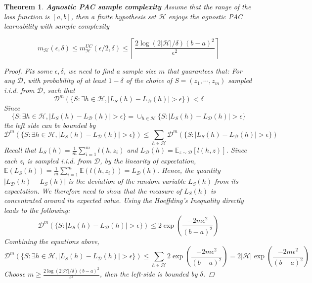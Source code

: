 \documentclass{article}
\newtheorem{theorem}{Theorem}
\newtheorem*{proof}{Proof}
\begin{document}
	\begin{theorem}
	\textbf{Agnostic PAC sample complexity} Assume that the range of the loss function is $[a,b]$, then a finite hypothesis set $\mathcal{H}$ enjoys the agnostic PAC learnability with sample complexity 
	
	\begin{equation}
	m_\mathcal{H}(\epsilon,\delta)\leq m^{UC}_\mathcal{H}(\epsilon/2,\delta)\leq\left\lceil\frac{2\log(2|\mathcal{H}|/\delta)(b-a)^2}{\epsilon^2}\right\rceil
	\end{equation}
	
	\begin{proof}
	Fix some $\epsilon,\delta$, we need to find a sample size $m$ that guarantees that: For any $\mathcal{D}$, with probability of at least $1-\delta$ of the choice of $S=(z_1,\cdots,z_m)$ sampled i.i.d. from $\mathcal{D}$, such that
	\begin{equation*}
	\mathcal{D}^m(\{S:\exists h\in\mathcal{H}, |L_S(h)-L_\mathcal{D}(h)|>\epsilon\}) < \delta
	\end{equation*}
	Since
	\begin{equation*}
	\{S:\exists h\in\mathcal{H}, |L_S(h)-L_\mathcal{D}(h)|>\epsilon\} = \cup_{h\in\mathcal{H}}\{S:|L_S(h)-L_\mathcal{D}(h)|>\epsilon\}
	\end{equation*}
the left side can be bounded by
	\begin{equation*}
	\mathcal{D}^m(\{S:\exists h\in\mathcal{H}, |L_S(h)-L_\mathcal{D}(h)|>\epsilon\}) \leq \sum_{h\in\mathcal{H}} \mathcal{D}^m(\{S:|L_S(h)-L_\mathcal{D}(h)|>\epsilon\})
	\end{equation*}
	Recall that $L_S(h)=\frac{1}{m}\sum_{i=1}^m l(h,z_i)$ and $L_\mathcal{D}(h)=\mathbb{E}_{z\sim\mathcal{D}}[l(h,z)]$. Since each $z_i$ is sampled i.i.d. from $\mathcal{D}$, by the linearity of expectation, $\mathbb{E}(L_S(h))=\frac{1}{m}\sum_{i=1}^m \mathbb{E}(l(h,z_i))=L_\mathcal{D}(h)$. Hence, the quantity $|L_\mathcal{D}(h)-L_S(h)|$ is the deviation of the random variable $L_S(h)$ from its expectation. We therefore need to show that the measure of $L_S(h)$ is concentrated around its expected value. Using the Hoeffding's Inequality directly leads to the following:
	\begin{equation*}
	\mathcal{D}^m(\{S:|L_S(h)-L_\mathcal{D}(h)|>\epsilon\}) \leq 2 \exp \left( \frac{-2m\epsilon^2 }{(b-a)^2} \right)
	\end{equation*}
	Combining the equations above,
	\begin{equation*}
	\mathcal{D}^m(\{S:\exists h\in\mathcal{H}, |L_S(h)-L_\mathcal{D}(h)|>\epsilon\}) \leq \sum_{h\in\mathcal{H}} 2 \exp \left( \frac{-2m\epsilon^2 }{(b-a)^2} \right) = 2|\mathcal{H}|\exp \left( \frac{-2m\epsilon^2 }{(b-a)^2} \right)
	\end{equation*}
	Choose $m\geq\frac{2\log(2|\mathcal{H}|/\delta)(b-a)^2}{\epsilon^2}$, then the left-side is bounded by $\delta$.
	\end{proof}	
	\end{theorem}
\end{document}
